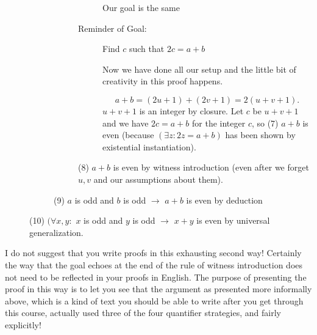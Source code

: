 \documentclass[12pt]{article}
\begin{document}
\begin{description}
\begin{description}
\begin{description}
\begin{description}
Our goal is the same

\item[Reminder of Goal:]  Find $c$ such that $2c=a+b$

Now we have done all our setup and the little bit of creativity in this proof happens.

$$a+b = (2u+1) + (2v+1) = 2(u+v+1).$$  $u+v+1$ is an integer by closure.  Let $c$ be $u+v+1$ and we have
$2c=a+b$ for the integer $c$, so (7) $a+b$ is even (because $(\exists z:2z=a+b)$ has been shown by existential instantiation).

\end{description}
(8) $a+b$ is even by witness introduction (even after we forget $u,v$ and our assumptions about them).
\end{description}
(9)  $a$ is odd and $b$ is odd $\rightarrow$  $a+b$ is even by deduction
\end{description}
(10) $(\forall x,y:$ $x$ is odd and $y$ is odd $\rightarrow$ $x+y$ is even by universal generalization.

\end{description}

I do not suggest that you write proofs in this exhausting second way!  Certainly the way that the goal echoes at the end of the rule of witness introduction does not need to be reflected in your proofs in English.  The purpose of presenting the proof in this way is to let you see that the argument as presented more informally above, which is a kind of text you should be able to write after you get through this course, actually used three of the four quantifier strategies, and fairly explicitly!
\end{document}
